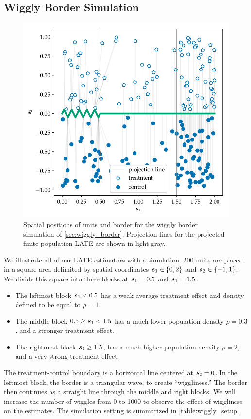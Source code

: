 \subsection{Wiggly Border Simulation}
\label{sec:wiggly_border}

\begin{figure}[tb]
\centering
\includegraphics[height=0.35\textheight]{figures/wiggly_boundaries_setup.pdf}
\caption{
    \label{fig:wiggly_boundaries_setup}
    Spatial positions of units and border for the wiggly border simulation of \autoref{sec:wiggly_border}. Projection lines for the projected finite population LATE are shown in light gray.}
\end{figure}


We illustrate all of our LATE estimators with a simulation.
200 units are placed in a square area delimited by spatial coordinates \(\bm{s}_1 \in \left\lbrace0,2\right\rbrace\) and \(\bm{s}_2 \in \left\lbrace-1, 1\right\rbrace\).
We divide this square into three blocks at \(\bm{s}_1=0.5\) and \(\bm{s}_1=1.5\):
\begin{itemize}
\item
  The leftmost block \(\bm{s}_1 < 0.5\) has a weak average treatment effect and density defined to be equal to \(\rho=1\).
\item
  The middle block \(0.5 \ge \bm{s}_1 < 1.5\) has a much lower population density \(\rho=0.3\), and a stronger treatment effect.
\item
  The rightmost block \(\bm{s}_1 \ge 1.5\), has a much higher population density \(\rho=2\), and a very strong treatment effect.
\end{itemize}
The treatment-control boundary is a horizontal line centered at \(\bm{s}_2=0\).
In the leftmost block, the border is a triangular wave, to create ``wiggliness.''
The border then continues as a straight line through the middle and right blocks.
We will increase the number of wiggles from 0 to 1000 to observe the effect of wiggliness on the estimates.
The simulation setting is summarized in \autoref{table:wiggly_setup}.
 
